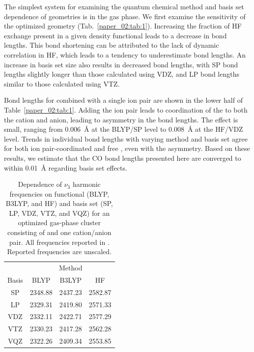 \documentclass[%
  class = book,%
  crop = false,%
  float = true,%
  multi = true,%
  preview = false,%
]{standalone}
\begin{document}
The simplest system for examining the quantum chemical method and basis set dependence of geometries is  in the gas phase. We first examine the sensitivity of the optimized geometry (Tab.~\ref{paper_02:tab:1}). Increasing the fraction of HF exchange present in a given density functional leads to a decrease in bond lengths. This bond shortening can be attributed to the lack of dynamic correlation in HF, which leads to a tendency to underestimate bond lengths. An increase in basis set size also results in decreased bond lengths, with SP bond lengths slightly longer than those calculated using VDZ, and LP bond lengths similar to those calculated using VTZ.

Bond lengths for  combined with a single ion pair are shown in the lower half of Table~\ref{paper_02:tab:1}. Adding the ion pair leads to coordination of the  to both the cation and anion, leading to asymmetry in the  bond lengths. The effect is small, ranging from \SI{0.006}{\angstrom} at the BLYP/SP level to \SI{0.008}{\angstrom} at the HF/VDZ level. Trends in individual  bond lengths with varying method and basis set agree for both ion pair-coordinated  and free , even with the asymmetry. Based on these results, we estimate that the CO bond lengths presented here are converged to within \SI{0.01}{\angstrom} regarding basis set effects.

\begin{table}
  \centering
  \caption[Functional and basis set dependence of \texorpdfstring{ \(\nu_3\)}{carbon dioxide asymmetric stretch} frequencies]{Dependence of \(\nu_3\) harmonic frequencies on functional (BLYP, B3LYP, and HF) and basis set (SP, LP, VDZ, VTZ, and VQZ) for an optimized gas-phase cluster consisting of  and one cation/anion pair. All frequencies reported in \si{\wavenumber}. Reported frequencies are unscaled.}
  \label{paper_02:tab:2}
  \begin{tabular}{cccc}
    \toprule
    & \multicolumn{3}{c}{Method} \\
    \cmidrule{2-4}
    Basis & BLYP & B3LYP & HF \\
    \midrule
    SP & 2348.88 & 2437.23 & 2582.87 \\
    LP & 2329.31 & 2419.80 & 2571.33 \\
    VDZ & 2332.11 & 2422.71 & 2577.29 \\
    VTZ & 2330.23 & 2417.28 & 2562.28 \\
    VQZ & 2322.26 & 2409.34 & 2553.85 \\
    \bottomrule
  \end{tabular}
\end{table}
\end{document}

